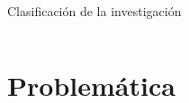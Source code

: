 \documentclass[aspectratio=169]{beamer}
\begin{document}
\begin{frame}{Clasificación de la investigación}
\begin{columns}[T]
\vspace{0.4em}
\end{columns}
\end{frame}


\section{Problemática}
\end{document}
